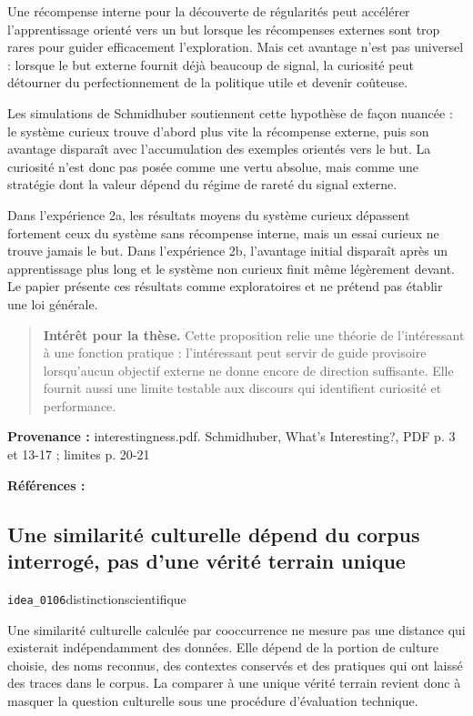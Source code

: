 \documentclass[10pt,a4paper]{article}
\begin{document}
Une récompense interne pour la découverte de régularités peut accélérer l'apprentissage orienté vers un but lorsque les récompenses externes sont trop rares pour guider efficacement l'exploration. Mais cet avantage n'est pas universel : lorsque le but externe fournit déjà beaucoup de signal, la curiosité peut détourner du perfectionnement de la politique utile et devenir coûteuse.

Les simulations de Schmidhuber soutiennent cette hypothèse de façon nuancée : le système curieux trouve d'abord plus vite la récompense externe, puis son avantage disparaît avec l'accumulation des exemples orientés vers le but. La curiosité n'est donc pas posée comme une vertu absolue, mais comme une stratégie dont la valeur dépend du régime de rareté du signal externe.

Dans l'expérience 2a, les résultats moyens du système curieux dépassent fortement ceux du système sans récompense interne, mais un essai curieux ne trouve jamais le but. Dans l'expérience 2b, l'avantage initial disparaît après un apprentissage plus long et le système non curieux finit même légèrement devant. Le papier présente ces résultats comme exploratoires et ne prétend pas établir une loi générale.

\begin{quote}
\textbf{Intérêt pour la thèse.} Cette proposition relie une théorie de l'intéressant à une fonction pratique : l'intéressant peut servir de guide provisoire lorsqu'aucun objectif externe ne donne encore de direction suffisante. Elle fournit aussi une limite testable aux discours qui identifient curiosité et performance.
\end{quote}
{\footnotesize\color{metadata}\textbf{Provenance :} interestingness.pdf. Schmidhuber, What's Interesting?, PDF p. 3 et 13-17 ; limites p. 20-21\par}
{\footnotesize\color{metadata}\textbf{Références :} \parencite{schmidhuber1997interesting}\par}

\subsection{Une similarité culturelle dépend du corpus interrogé, pas d'une vérité terrain unique}
{\small\color{metadata} \texttt{idea\_0106}\quad\textbullet\quad distinction\quad\textbullet\quad scientifique\par}

Une similarité culturelle calculée par cooccurrence ne mesure pas une distance qui existerait indépendamment des données. Elle dépend de la portion de culture choisie, des noms reconnus, des contextes conservés et des pratiques qui ont laissé des traces dans le corpus. La comparer à une unique vérité terrain revient donc à masquer la question culturelle sous une procédure d'évaluation technique.
\end{document}
